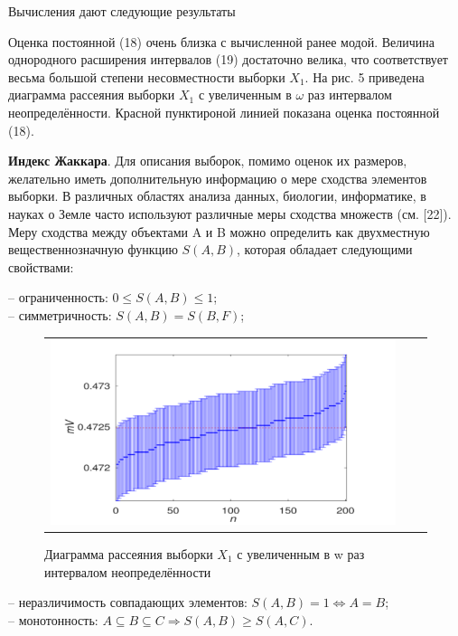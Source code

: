 \documentclass[a4paper,14pt]{article}
\begin{document}
	Вычисления дают следующие результаты
	
	Оценка постоянной (18) очень близка с вычисленной ранее модой. Величина
	однородного расширения интервалов (19) достаточно велика, что соответствует
	весьма большой степени несовместности выборки $X_1$.
	На рис. 5 приведена диаграмма рассеяния выборки $X_1$ с увеличенным в $\omega$
	раз интервалом неопределённости.
	Красной пунктироной линией показана оценка постоянной (18).
	
	\textbf{Индекс Жаккара}. Для описания выборок, помимо оценок их размеров, желательно иметь дополнительную информацию о мере сходства элементов выборки. В различных областях анализа данных, биологии, информатике, в науках
	о Земле часто используют различные меры сходства множеств (см. [22]). Меру
	сходства между объектами A и B можно определить как двухместную вещественнозначную функцию $S(A, B)$, которая обладает следующими свойствами:
	
	\noindent-- ограниченность: $0 \leq S(A, B) \leq 1$;\\
	\noindent-- симметричность: $S(A, B) = S(B, F)$;
	
	\begin{figure}[H]
		\begin{center}
			\begin{tabular}{ccc}
				\includegraphics[scale=0.8]{../image/interval_theory_2.png}
			\end{tabular}
		\end{center}
		\caption{Диаграмма рассеяния выборки $X_1$ с увеличенным в w раз интервалом неопределённости} 
	\end{figure}

	\noindent-- неразличимость совпадающих элементов: $S(A, B) = 1 \Leftrightarrow A = B$;\\
	\noindent-- монотонность: $A \subseteq B \subseteq C \Rightarrow S(A, B) \geq S(A, C)$.
	
\end{document}
